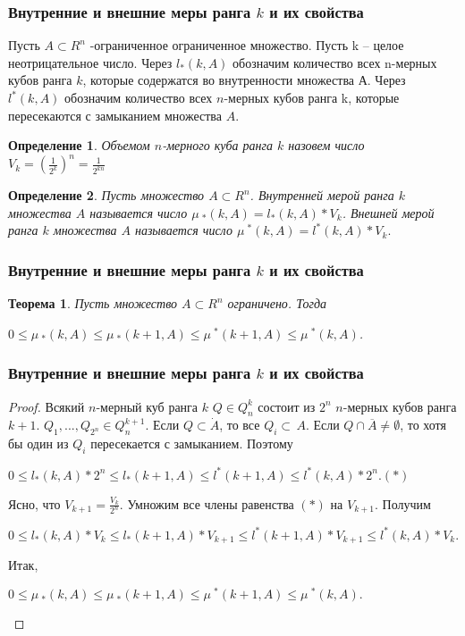 \documentclass{beamer}
\newtheorem{ru_theo}{Теорема}
\renewenvironment{theorem}{\begin{ru_theo}}{\end{ru_theo}}
\newtheorem{ru_def}{Определение}
\renewenvironment{definition}{\begin{ru_def}}{\end{ru_def}}
\begin{document}
\begin{frame}
\frametitle{Внутренние и внешние меры ранга $k$ и их свойства}
	Пусть $A \subset R^n$ -ограниченное ограниченное множество. Пусть k – целое неотрицательное число. Через $l_*(k, A)$ обозначим количество всех n-мерных кубов ранга $k$, которые содержатся во внутренности множества А. Через $l^*(k, A)$  обозначим количество всех $n$-мерных кубов ранга k, которые пересекаются с замыканием множества $A$.
	\begin{definition}
	\textit{Объемом} $n$-мерного куба ранга $k$ назовем число $V_k = (\frac{1}{2^k})^n = \frac{1}{2^{kn}}$
	\end{definition} 

	\begin{definition}
	 Пусть множество $A \subset R^n$. \textit{Внутренней мерой ранга $k$ множества $A$} называется число $\mu\ _* (k, A) = l_*(k, A)*V_k$. \textit{Внешней мерой ранга $k$ множества $A$} называется число $\mu\ ^* (k, A) = l^*(k, A)*V_k.$
	\end{definition} 
\end{frame}

\begin{frame}
\frametitle{Внутренние и внешние меры ранга $k$ и их свойства}
	\begin{theorem}
	Пусть множество $A \subset R^n$ ограничено. Тогда
	\begin{center}
 	$0 \leq \mu\  _* (k, A) \leq \mu\  _* (k+1, A) \leq  \mu\ ^* (k+1, A) \leq \mu\ ^* (k, A)$.
	\end{center}
	\end{theorem}
\end{frame}


\begin{frame}
\frametitle{Внутренние и внешние меры ранга $k$ и их свойства}
	\begin{proof}
 	Всякий $n$-мерный куб ранга $k$ $Q \in Q_n^k$ состоит из $2^n$ $n$-мерных кубов ранга $k+1$.
$Q_1, ..., Q_{2^n} \in Q_{n}^{k+1}$. Если $Q \subset \dot{A}$, то все $Q_i \subset \,{A}$. Если $Q \cap \overline{A} \ne \emptyset$, то хотя бы один из $Q_i$ пересекается с замыканием. Поэтому
	\begin{center}
	$0\leq l_*(k, A) * 2^n \leq l_*(k+1, A) \leq l^*(k+1, A) \leq l^*(k, A) *2^n. (*)$
	\end{center}
Ясно, что $V_{k+1} = \frac{V_k}{2^n}$. Умножим все члены равенства $(*)$ на $V_{k+1}$. Получим
	\begin{center}
	$0\leq l_*(k, A) * V_k \leq l_*(k+1, A) * V_{k+1} \leq l^*(k+1, A) * V_{k+1} \leq l^*(k, A) * V_k.$
	\end{center}
Итак, 
	\begin{center}
 	$0 \leq \mu\  _* (k, A) \leq \mu\  _* (k+1, A) \leq  \mu\ ^* (k+1, A) \leq \mu\ ^* (k, A).$
	\end{center}
	\end{proof}
\end{frame}
\end{document}
